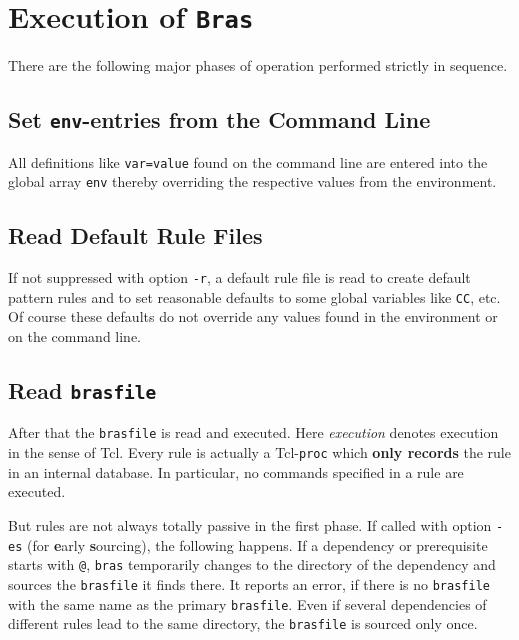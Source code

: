 \documentclass[12pt]{article}
\newcommand{\bras}{\texttt{bras}}
\newcommand{\Bras}{\texttt{Bras}}
\begin{document}
\section{Execution of \Bras}

There are the following major phases of operation performed strictly in
sequence.

\subsection{Set \texttt{env}-entries from the Command Line}
All definitions like \texttt{var=value} found on the command
line are entered into the global array \texttt{env} thereby
overriding the respective values from the environment.

\subsection{Read Default Rule Files}
If not suppressed with option \texttt{-r}, a default rule file is read
to create default pattern rules and to set reasonable defaults to some
global variables like \texttt{CC}, etc. Of course these defaults do
not override any values found in the environment or on the command line.

\subsection{Read \texttt{brasfile}}

After that the \texttt{brasfile} is read and executed. Here
\textit{execution} denotes execution in the sense of Tcl. Every rule
is actually a Tcl-\texttt{proc} which \textbf{only records} the rule
in an internal database. In particular, no commands specified in a
rule are executed.

But rules are not always totally passive in the first phase. 
If called with option \texttt{-es} (for \textbf{e}arly
\textbf{s}ourcing), the following happens.
If a dependency or prerequisite starts with \texttt{@}, \bras{}
temporarily changes to the directory of the dependency and sources the
\texttt{brasfile} it finds there. It reports an error, if there is no
\texttt{brasfile} with the same name as the primary
\texttt{brasfile}. Even if several dependencies of different rules lead
to the same directory, the \texttt{brasfile} is sourced only once.
\end{document}
